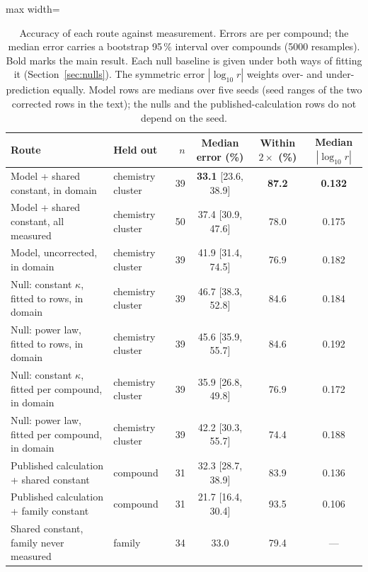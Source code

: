 \begin{table}[t]
  \centering
  \caption{Accuracy of each route against measurement. Errors are per compound; the median error
  carries a bootstrap 95\,\% interval over compounds (\num{5000} resamples). Bold marks the main
  result. Each null baseline is given under both ways of fitting it (Section~\ref{sec:nulls}). The symmetric error
  $|\log_{10} r|$ weights over- and under-prediction equally. Model rows are medians over five seeds
  (seed ranges of the two corrected rows in the text); the nulls and the published-calculation rows do not depend on the seed.}
  \label{tab:accuracy}
  \small
  \begin{adjustbox}{max width=\linewidth}
  \begin{tabular}{llrccc}
    \toprule
    Route & Held out & $n$ & Median error (\si{\percent}) & Within $2\times$ (\si{\percent}) & Median $|\log_{10} r|$ \\
    \midrule
    Model + shared constant, in domain & chemistry cluster & 39 & \textbf{33.1} [23.6, 38.9] & \textbf{87.2} & \textbf{0.132} \\
    Model + shared constant, all measured & chemistry cluster & 50 & 37.4 [30.9, 47.6] & 78.0 & 0.175 \\
    Model, uncorrected, in domain & chemistry cluster & 39 & 41.9 [31.4, 74.5] & 76.9 & 0.182 \\
    Null: constant $\kappa$, fitted to rows, in domain & chemistry cluster & 39 & 46.7 [38.3, 52.8] & 84.6 & 0.184 \\
    Null: power law, fitted to rows, in domain & chemistry cluster & 39 & 45.6 [35.9, 55.7] & 84.6 & 0.192 \\
    Null: constant $\kappa$, fitted per compound, in domain & chemistry cluster & 39 & 35.9 [26.8, 49.8] & 76.9 & 0.172 \\
    Null: power law, fitted per compound, in domain & chemistry cluster & 39 & 42.2 [30.3, 55.7] & 74.4 & 0.188 \\
    \midrule
    Published calculation + shared constant & compound & 31 & 32.3 [28.7, 38.9] & 83.9 & 0.136 \\
    Published calculation + family constant & compound & 31 & 21.7 [16.4, 30.4] & 93.5 & 0.106 \\
    Shared constant, family never measured & family & 34 & 33.0 & 79.4 & --- \\
    \bottomrule
  \end{tabular}
  \end{adjustbox}
\end{table}

